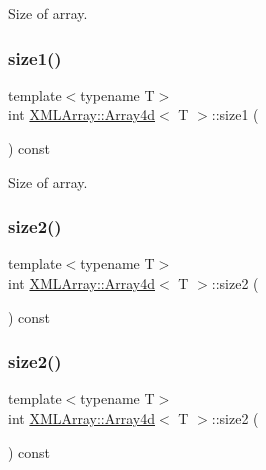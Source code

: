 Size of array. 

\mbox{\label{classXMLArray_1_1Array4d_a27899b6dccfd5d85d299da80da9a4c14}} 
\subsubsection{\texorpdfstring{size1()}{size1()}\hspace{0.1cm}{\footnotesize\ttfamily [3/3]}}
{\footnotesize\ttfamily template$<$typename T$>$ \\
int \mbox{\hyperlink{classXMLArray_1_1Array4d}{X\+M\+L\+Array\+::\+Array4d}}$<$ T $>$\+::size1 (\begin{DoxyParamCaption}{ }\end{DoxyParamCaption}) const\hspace{0.3cm}{\ttfamily [inline]}}



Size of array. 

\mbox{\label{classXMLArray_1_1Array4d_a18c3f8237c652b642c5de6df15764c34}} 
\subsubsection{\texorpdfstring{size2()}{size2()}\hspace{0.1cm}{\footnotesize\ttfamily [1/3]}}
{\footnotesize\ttfamily template$<$typename T$>$ \\
int \mbox{\hyperlink{classXMLArray_1_1Array4d}{X\+M\+L\+Array\+::\+Array4d}}$<$ T $>$\+::size2 (\begin{DoxyParamCaption}{ }\end{DoxyParamCaption}) const\hspace{0.3cm}{\ttfamily [inline]}}

\mbox{\label{classXMLArray_1_1Array4d_a18c3f8237c652b642c5de6df15764c34}} 
\subsubsection{\texorpdfstring{size2()}{size2()}\hspace{0.1cm}{\footnotesize\ttfamily [2/3]}}
{\footnotesize\ttfamily template$<$typename T$>$ \\
int \mbox{\hyperlink{classXMLArray_1_1Array4d}{X\+M\+L\+Array\+::\+Array4d}}$<$ T $>$\+::size2 (\begin{DoxyParamCaption}{ }\end{DoxyParamCaption}) const\hspace{0.3cm}{\ttfamily [inline]}}

